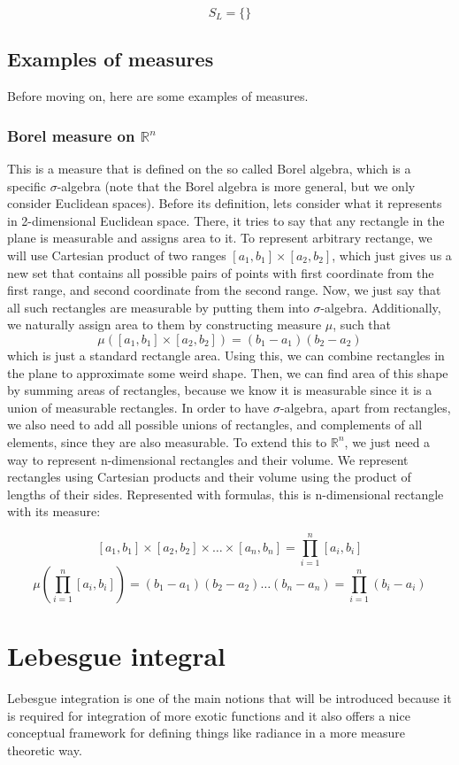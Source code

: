 \documentclass{article}
\begin{document}
\[ S_{L}=\{\} \]

\subsection{Examples of measures}

Before moving on, here are some examples of measures.

\subsubsection{Borel measure on $\mathbb{R}^n$}
This is a measure that is defined on the so called Borel algebra, which is a specific $\sigma$-algebra (note that the Borel algebra is more general, but we only consider Euclidean spaces). Before its definition, lets consider what it represents in 2-dimensional Euclidean space. There, it tries to say that any rectangle in the plane is measurable and assigns area to it. To represent arbitrary rectange, we will use Cartesian product of two ranges $[a_1, b_1]\times[a_2, b_2]$, which just gives us a new set that contains all possible pairs of points with first coordinate from the first range, and second coordinate from the second range. Now, we just say that all such rectangles are measurable by putting them into $\sigma$-algebra. Additionally, we naturally assign area to them by constructing measure $\mu$, such that
\[\mu([a_1, b_1]\times[a_2, b_2])=(b_1-a_1)(b_2-a_2)\]
which is just a standard rectangle area. Using this, we can combine rectangles in the plane to approximate some weird shape. Then, we can find area of this shape by summing areas of rectangles, because we know it is measurable since it is a union of measurable rectangles. In order to have $\sigma$-algebra, apart from rectangles, we also need to add all possible unions of rectangles, and complements of all elements, since they are also measurable.
\newline\indent To extend this to $\mathbb{R}^n$, we just need a way to represent n-dimensional rectangles and their volume. We represent rectangles using Cartesian products and their volume using the product of lengths of their sides. Represented with formulas, this is n-dimensional rectangle with its measure:

\[ [a_1,b_1]\times[a_2,b_2]\times\dots\times[a_n,b_n] = \prod_{i=1}^{n}[a_i,b_i] \]
\[ \mu(\prod_{i=1}^{n}[a_i,b_i])=(b_1-a_1)(b_2-a_2)\dots(b_n-a_n)=\prod_{i=1}^{n}(b_i-a_i) \]

\section{Lebesgue integral}
Lebesgue integration is one of the main notions that will be introduced because it is required for integration of more exotic functions and it also offers a nice conceptual framework for defining things like radiance in a more measure theoretic way.
\end{document}
